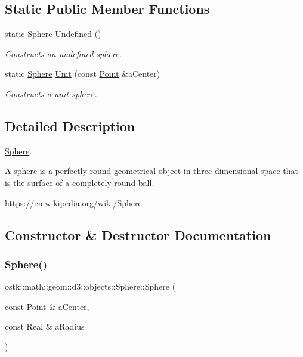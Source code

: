 \subsection*{Static Public Member Functions}
\begin{DoxyCompactItemize}
\item 
static \hyperlink{classostk_1_1math_1_1geom_1_1d3_1_1objects_1_1_sphere}{Sphere} \hyperlink{classostk_1_1math_1_1geom_1_1d3_1_1objects_1_1_sphere_ae5092dbaff1a7827de173fd61c8aa0df}{Undefined} ()
\begin{DoxyCompactList}\small\item\em Constructs an undefined sphere. \end{DoxyCompactList}\item 
static \hyperlink{classostk_1_1math_1_1geom_1_1d3_1_1objects_1_1_sphere}{Sphere} \hyperlink{classostk_1_1math_1_1geom_1_1d3_1_1objects_1_1_sphere_a5e0bd57337eb7e5c7eb19b66176d560b}{Unit} (const \hyperlink{classostk_1_1math_1_1geom_1_1d3_1_1objects_1_1_point}{Point} \&a\+Center)
\begin{DoxyCompactList}\small\item\em Constructs a unit sphere. \end{DoxyCompactList}\end{DoxyCompactItemize}


\subsection{Detailed Description}
\hyperlink{classostk_1_1math_1_1geom_1_1d3_1_1objects_1_1_sphere}{Sphere}. 

A sphere is a perfectly round geometrical object in three-\/dimensional space that is the surface of a completely round ball.

https\+://en.wikipedia.\+org/wiki/\+Sphere 

\subsection{Constructor \& Destructor Documentation}
\mbox{\label{classostk_1_1math_1_1geom_1_1d3_1_1objects_1_1_sphere_a6920f72260a7b2c9ffc29283540e16c2}} 
\subsubsection{\texorpdfstring{Sphere()}{Sphere()}}
{\footnotesize\ttfamily ostk\+::math\+::geom\+::d3\+::objects\+::\+Sphere\+::\+Sphere (\begin{DoxyParamCaption}\item[{const \hyperlink{classostk_1_1math_1_1geom_1_1d3_1_1objects_1_1_point}{Point} \&}]{a\+Center,  }\item[{const Real \&}]{a\+Radius }\end{DoxyParamCaption})}



